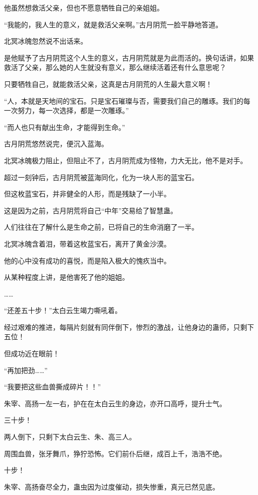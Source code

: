 \begin{this_body}
他虽然想救活父亲，但也不愿意牺牲自己的亲姐姐。

“我能的，我人生的意义，就是救活父亲啊。”古月阴荒一脸平静地答道。

北冥冰魄忽然说不出话来。

是他赋予了古月阴荒这个人生的意义，古月阴荒就是为此而活的。换句话讲，如果救活了父亲，那么她的人生就没有意义，那么继续活着还有什么意思呢？

只要牺牲自己，就能救活父亲，这真是古月阴荒的人生最大意义啊！

“人，本就是天地间的宝石。只是宝石璀璨与否，需要我们自己的雕琢。我们的每一次努力，每一次选择，都是一次雕琢。”

“而人也只有献出生命，才能得到生命。”

古月阴荒悠然说完，便沉入蓝海。

北冥冰魄极力阻止，但阻止不了，古月阴荒成为怪物，力大无比，他不是对手。

超过一刻钟后，古月阴荒被蓝海同化，化为一块人形的蓝宝石。

但这枚蓝宝石，并非健全的人形，而是残缺了一小半。

这是因为之前，古月阴荒将自己“中年”交易给了智慧蛊。

人们往往在了解什么是生命之前，已将自己的生命消磨了一半。

北冥冰魄含着泪，带着这枚蓝宝石，离开了黄金沙漠。

他的心中没有成功的喜悦，而是陷入极大的愧疚当中。

从某种程度上讲，是他害死了他的姐姐。

……

“还差五十步！”太白云生竭力嘶吼着。

经过艰难的推进，每隔片刻就有同伴倒下，惨烈的激战，让他身边的蛊师，只剩下五位！

但成功近在眼前！

“再加把劲……”

“我要把这些血兽撕成碎片！！”

朱宰、高扬一左一右，护在在太白云生的身边，亦开口高呼，提升士气。

三十步！

两人倒下，只剩下太白云生、朱、高三人。

周围血兽，张牙舞爪，狰狞恐怖。它们前仆后继，成百上千，浩浩不绝。

十步！

朱宰、高扬奋尽全力，蛊虫因为过度催动，损失惨重，真元已然见底。


\end{this_body}
